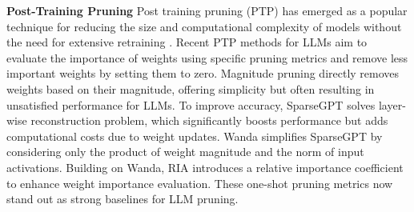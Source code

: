 \textbf{Post-Training Pruning}  
Post training pruning (PTP) has emerged as a popular technique for reducing the size and computational complexity of models without the need for extensive retraining \citep{hubara2021accelerated, kwon2022fast, frantar2023sparsegpt}. 
Recent PTP methods for LLMs aim to evaluate the importance of weights using specific pruning metrics and remove less important weights by setting them to zero.
Magnitude pruning \citep{han2015learning} directly removes weights based on their magnitude, offering simplicity but often resulting in unsatisfied performance for LLMs. To improve accuracy, SparseGPT \citep{frantar2023sparsegpt} solves layer-wise reconstruction problem, which significantly boosts performance but adds computational costs due to weight updates. 
Wanda \citep{sun2023simple} simplifies SparseGPT by considering only the product of weight magnitude and the norm of input activations. Building on Wanda, RIA \citep{zhangplug} introduces a relative importance coefficient to enhance weight importance evaluation. These one-shot pruning metrics now stand out as strong baselines for LLM pruning.